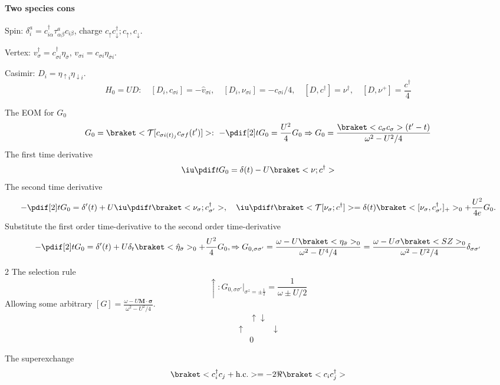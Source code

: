\paragraph{Two species cons}

\begin{enumext}[columns = 2]
  \item Spin: $\delta_i^a = c_{i\alpha}^\dagger
    \tau_{\alpha\beta}^a c_{i\beta}$, charge
  $c_\uparrow c_\downarrow^\dagger; c_\uparrow, c_\downarrow$.
  \item Vertex: $v_\sigma^\dagger = c_{\sigma i}^\dagger \eta_{\bar\sigma}$,
  $v_{\sigma i} = c_{\sigma i} \eta_{\bar\sigma i}$.
  \item Casimir: $D_i = \eta_{\uparrow i} \eta_{\downarrow i}$.
  \[
    H_0 = UD: \quad
    [D_i, c_{\sigma i}] = -\hat v_{\sigma i},\quad
    [D_i, \nu_{\sigma i}] = -c_{\sigma i}/4, \quad
    [D, c^\dagger] = \nu^\dagger,\quad
    [D,\nu^+] = \frac{c^\dagger}{4}
  \]
\end{enumext}
The EOM for $G_0$
\[
  G_0 = \braket<\mathcal T[c_{\sigma i(t)_j} c_{\sigma f}(t')]>:\
  -\pdif[2]t G_0 = \frac{U^2}{4} G_0 \Rightarrow G_0
  = \frac{\braket<c_\sigma c_\sigma>(t' - t)}{\omega^2 - U^2/4}
\]
The first time derivative
\[
  \iu\pdif t G_0 = \delta(t) - U\braket<\nu; c^\dagger>
\]
The second time derivative
\[
  -\pdif[2]t G_0
= \delta'(t) + U\iu\pdif t\braket<\nu_\sigma; c_{\sigma'}^\dagger>, \quad
  \iu \pdif t\braket<\mathcal T[\nu_\sigma; c^\dagger]>
= \delta(t) \braket<[\nu_\sigma, c_{\sigma'}^\dagger]_+>_0 + \frac{U^2}{4e} G_0.
\]
Substitute the first order time-derivative to the second order time-derivative
\[
  -\pdif[2]t G_0 = \delta'(t) + U\delta_t \braket<\hat \eta_{\bar\sigma}>_0
+ \frac{U^2}{4} G_0, \Rightarrow G_{0,\sigma\sigma'}
= \frac{\omega - U\braket<\eta_{\bar\sigma}>_0}{\omega^2 - U^4/4}
= \frac{\omega - U\sigma\braket<SZ>_0}{\omega^2 - U^2/4} \delta_{\sigma\sigma'}
\]
\begin{paracol}{2}
The selection rule
\[
  \uparrow: G_{0,\sigma\sigma'} \big|_{\sigma^z = \pm\frac12}
= \frac1{\omega \pm U/2}
\]
Allowing some
arbitrary $[G] = \frac{\omega - U \bm M \cdot \bm \sigma}{\omega^2 - U^2/4}$.
\switchcolumn \centering
\[
  \begin{array}{ccc}
    & \uparrow \downarrow\\
  \uparrow & & \downarrow\\
  & 0
  \end{array}
\]
\end{paracol}
The superexchange
\[
  \braket<c_i^\dagger c_j + \text{h.c.}> = -2\Re\braket<c_ic_j^\dagger>
\]
